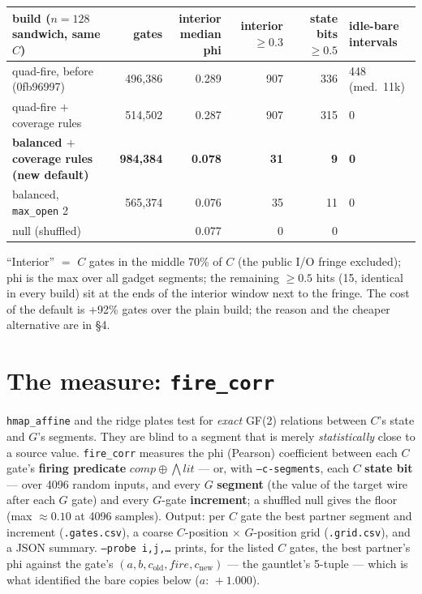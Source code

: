 \documentclass[11pt]{article}
\newcommand{\xor}{\oplus}
\newcommand{\doc}[1]{\texttt{#1}}
\begin{document}
\begin{center}\footnotesize
\begin{tabular}{@{}p{4.6cm}rrrrl@{}}\toprule
build ($n=128$ sandwich, same $C$) & gates & \shortstack[r]{interior\\median phi} & \shortstack[r]{interior\\$\ge0.3$} & \shortstack[r]{state bits\\$\ge0.5$} & \shortstack[l]{idle-bare\\intervals}\\\midrule
quad-fire, before (0fb96997) & 496,386 & 0.289 & 907 & 336 & 448 (med.\ 11k)\\
quad-fire $+$ coverage rules & 514,502 & 0.287 & 907 & 315 & 0\\
\textbf{balanced $+$ coverage rules (new default)} & \textbf{984,384} & \textbf{0.078} & \textbf{31} & \textbf{9} & \textbf{0}\\
balanced, \doc{max\_open} 2 & 565,374 & 0.076 & 35 & 11 & 0\\
null (shuffled) & & 0.077 & 0 & 0 & \\\bottomrule
\end{tabular}
\end{center}

``Interior'' $=$ $C$ gates in the middle 70\% of $C$ (the public I/O fringe excluded); phi is
the max over all gadget segments; the remaining $\ge0.5$ hits (15, identical in every build)
sit at the ends of the interior window next to the fringe. The cost of the default is +92\%
gates over the plain build; the reason and the cheaper alternative are in \S4.

\section{The measure: \doc{fire\_corr}}

\doc{hmap\_affine} and the ridge plates test for \emph{exact} GF(2) relations between $C$'s
state and $G$'s segments. They are blind to a segment that is merely \emph{statistically}
close to a source value. \doc{fire\_corr} measures the phi (Pearson) coefficient between each
$C$ gate's \textbf{firing predicate} $\mathit{comp}\xor\bigwedge\mathit{lit}$ --- or, with
\doc{--c-segments}, each $C$ \textbf{state bit} --- over 4096 random inputs, and every $G$
\textbf{segment} (the value of the target wire after each $G$ gate) and every $G$-gate
\textbf{increment}; a shuffled null gives the floor (max ${\approx}0.10$ at 4096 samples).
Output: per $C$ gate the best partner segment and increment (\doc{.gates.csv}), a coarse
$C$-position $\times$ $G$-position grid (\doc{.grid.csv}), and a JSON summary.
\doc{--probe i,j,\ldots} prints, for the listed $C$ gates, the best partner's phi against the
gate's $(a, b, c_{\mathrm{old}}, \mathit{fire}, c_{\mathrm{new}})$ --- the gauntlet's
5-tuple --- which is what identified the bare copies below ($a{:}\,{+}1.000$).
\end{document}
